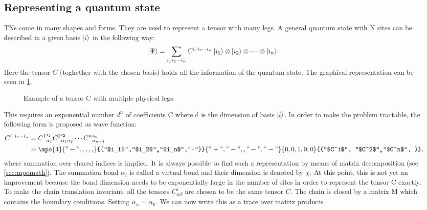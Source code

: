\subsection{Representing a quantum state}

\Glspl{TN} come in many shapes and forms. They are used to represent a tensor with many legs. A general quantum state with N sites can be described in a given basis $\ket{i}$ in the following way:
\begin{equation}
    \ket{\Psi} = \sum_{i_1 i_2 \cdots i_n } C^{i_1 i_2 \cdots i_n} \ket{i_1} \otimes \ket{i_2} \otimes \cdots \otimes \ket{i_n} .
\end{equation}
Here the tensor $C$ (toghether with the chosen basis) holds all the information of the quantum state. The graphical representation can be seen in \cref{fig:tens:intro:C}.
\begin{figure}[!htbp]
    \centering


    \caption{Example of a tensor C with multiple physical legs.}
    \label{fig:tens:intro:C}
\end{figure}
\noindent
This requires an exponential number $d^n$ of coefficients C where d is the dimension of basis $\ket{i}$. In order to make the problem tractable, the following form is proposed as wave function:
\begin{equation}
    \begin{split}
        C^{i_1 i_2 \cdots i_n} &= {C^{1}}_{\alpha_1}^{ i_1} {C^{2}}_{\alpha_1 \alpha_2}^{i_2} \cdots  {C^{n}}_{\alpha_{n-1} }^{i_n} \\
        & =\mpo{4}{{"-",,,,,}}{{"$i_1$","$i_2$",,"$i_n$","-"}}{{"-","-",,"-","-"}}{{0,0,1,0,0}}{{"$C^1$", "$C^2$",,"$C^n$", }} ,
    \end{split}
\end{equation}
where summation over shared indices is implied. It is always possible to find such a representation by means of matrix decomposition (see \cref{sec:mpomath}). The summation bond $\alpha_i$ is called a virtual bond and their dimension is denoted by $\chi$. At this point, this is not yet an improvement because the bond dimension needs to be exponentially large in the number of sites in order to represent the tensor C exactly. To make the chain translation invariant, all the tensors $C^i_{\alpha \beta }$ are chosen to be the same tensor $C$. The chain is closed by a matrix M which contains the boundary conditions. Setting $\alpha_n = \alpha_0$. We can now write this as a trace over matrix products
